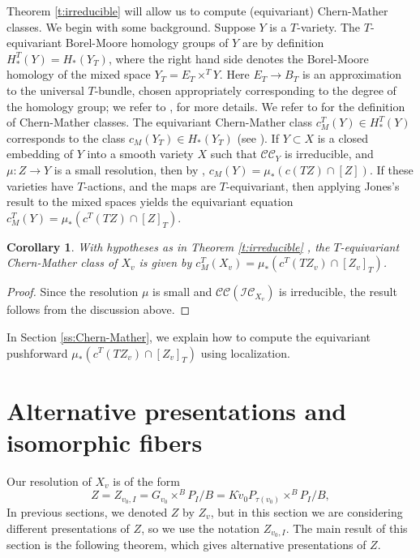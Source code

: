 \documentclass[11pt,letterpaper,reqno]{amsart}
\newcommand{\cC}{\mathcal C}
\newcommand{\cI}{\mathcal I}
\newcommand{\IC}{\cI \cC}
\newcommand{\CC}{\cC \cC}
\numberwithin{equation}{section}
\theoremstyle{plain}
\newtheorem{corollary}[theorem]{Corollary}
\theoremstyle{definition}
\theoremstyle{remark}
\begin{document}
Theorem \ref{t:irreducible} will allow us to compute (equivariant) Chern-Mather
classes.  
We begin with some background.  Suppose $Y$ is a $T$-variety.  
The $T$-equivariant
Borel-Moore homology groups of $Y$ are by definition $H^T_*(Y) = H_*(Y_T)$, where
the right hand side denotes the Borel-Moore homology of the mixed space $Y_T = E_T \times^T Y$.
Here $E_T \to B_T$ is an approximation to the universal $T$-bundle,
chosen appropriately corresponding to the degree of the homology group; we
refer to \cite{EdGr98}, \cite{AnFu24} for more details.  We refer to \cite{Jones2010} for
the definition of Chern-Mather classes.
The equivariant Chern-Mather class $c_M^T(Y) \in H^T_*(Y)$ corresponds to the class $c_M(Y_T) \in H_*(Y_T)$
(see \cite[\S4.3]{Ohm06}).
If $Y \subset X$ is a closed embedding of $Y$ into a smooth variety $X$ such that 
$\CC_Y$ is irreducible, and $\mu: Z \to Y$ is a small resolution, then
by \cite[Theorem 1.2.1]{Jones2010}, $c_M(Y) = \mu_*(c(TZ) \cap [Z])$.  
If these varieties have $T$-actions, and the maps are $T$-equivariant, then
applying Jones's result to the mixed spaces yields the equivariant
equation $c_M^T(Y) = \mu_*(c^T(TZ) \cap [Z]_T)$.


\begin{corollary} \label{c:CM}
With hypotheses as in Theorem \ref{t:irreducible} , the $T$-equivariant Chern-Mather class of $X_v$ is given by $c_M^T(X_v) = \mu_* (c^T (T Z_v) \cap [Z_v]_T)$.
\end{corollary}

\begin{proof}
Since the resolution $\mu$ is small and $\CC(\IC_{X_v})$ is irreducible, the result follows from the discussion above.
\end{proof}

In Section \ref{ss:Chern-Mather}, we explain how to compute the equivariant pushforward $\mu_* (c^T (T Z_v) \cap [Z_v]_T)$  using localization.  

\section{Alternative presentations and isomorphic fibers} \label{ss:isomorphic}
Our resolution of $X_v$ is of the form 
$$
Z = Z_{v_0, I} = G_{v_0} \times^B P_I/B = K \dot{v}_0 P_{\tau(v_0)} \times^B P_I/B,
$$
In previous sections, we denoted $Z$ by $Z_v$, but in this section we are considering
different presentations of $Z$, so we use the notation $Z_{v_0, I}$.
The main result of this section is the following theorem, which gives alternative presentations of $Z$.
\end{document}
